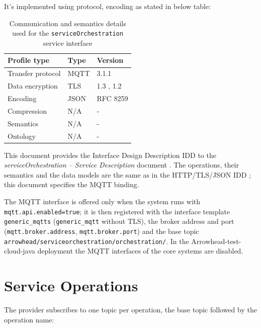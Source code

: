 \documentclass[a4paper]{arrowhead}
\begin{document}
It's implemented using protocol, encoding as stated in below table:
\begin{table}[ht!]
  \centering
  \begin{tabular}{|l|l|l|}
    \hline
    \rowcolor{gray!33} Profile type & Type & Version \\ \hline
    Transfer protocol & MQTT & 3.1.1 \cite{mqtt311} \\ \hline
    Data encryption & TLS & 1.3 \cite{rfc8446}, 1.2 \cite{rfc5246} \\ \hline
    Encoding & JSON & RFC 8259 \cite{rfc8259} \\ \hline
    Compression & N/A & - \\ \hline
    Semantics & N/A & - \\ \hline
    Ontology & N/A & - \\ \hline
  \end{tabular}
  \caption{Communication and semantics details used for the \texttt{service\allowbreak{}Orchestration} service interface}
  \label{tab:comunication_semantics_profile}
\end{table}

This document provides the Interface Design Description IDD to the \textit{serviceOrchestration -- Service Description} document \cite{ssso-serviceOrchestration-sd}.
The operations, their semantics and the data models are the same as in the HTTP/TLS/JSON IDD \cite{ssso-serviceOrchestration-http-idd}; this document specifies the MQTT binding.

The MQTT interface is offered only when the system runs with \texttt{mqtt.api.enabled=true}; it is then registered with the interface template \texttt{generic\_\allowbreak{}mqtts} (\texttt{generic\_\allowbreak{}mqtt} without TLS), the broker address and port (\texttt{mqtt.\allowbreak{}broker.\allowbreak{}address}, \texttt{mqtt.\allowbreak{}broker.\allowbreak{}port}) and the base topic \texttt{arrowhead/\allowbreak{}serviceorchestration/\allowbreak{}orchestration/\allowbreak{}}. In the Arrowhead-test-cloud-java deployment the MQTT interfaces of the core systems are disabled.

\newpage

\section{Service Operations}
\label{sec:operations}

The provider subscribes to one topic per operation, the base topic followed by the operation name:
\end{document}

